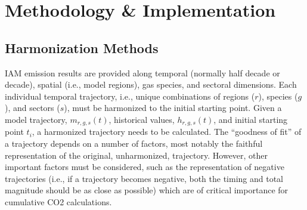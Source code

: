 \section{Methodology \& Implementation}\label{sec:meths}

\subsection{Harmonization Methods}

IAM emission results are provided along temporal (normally half decade or
decade), spatial (i.e., model regions), gas species, and sectoral
dimensions. Each individual temporal trajectory, i.e., unique combinations of
regions ($r$), species ($g$), and sectors ($s$), must be harmonized to the
initial starting point. Given a model trajectory, $m_{r, g, s}(t)$, historical
values, $h_{r, g, s}(t)$, and initial starting point $t_i$, a harmonized
trajectory needs to be calculated. The ``goodness of fit'' of a trajectory depends on
% 
% 
a number of factors, most notably the faithful representation of the original,
unharmonized, trajectory. However, other important factors must be considered,
such as the representation of negative trajectories (i.e., if a trajectory
becomes negative, both the timing and total magnitude should be as close as
possible) which are of critical importance for cumulative CO2 calculations.
% 
% 

